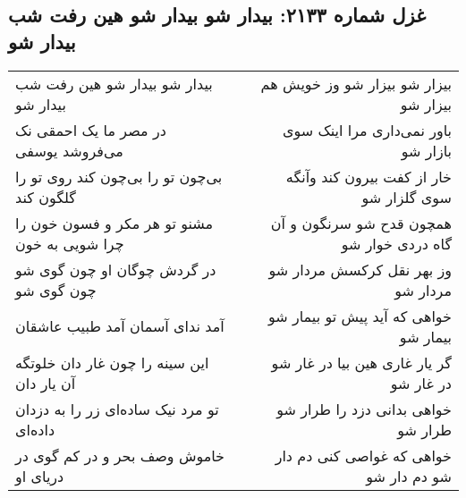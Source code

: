 \begin{center}
\section*{غزل شماره ۲۱۳۳: بیدار شو بیدار شو هین رفت شب بیدار شو}
\label{sec:2133}
\begin{longtable}{l p{0.5cm} r}
بیدار شو بیدار شو هین رفت شب بیدار شو
&&
بیزار شو بیزار شو وز خویش هم بیزار شو
\\
در مصر ما یک احمقی نک می‌فروشد یوسفی
&&
باور نمی‌داری مرا اینک سوی بازار شو
\\
بی‌چون تو را بی‌چون کند روی تو را گلگون کند
&&
خار از کفت بیرون کند وآنگه سوی گلزار شو
\\
مشنو تو هر مکر و فسون خون را چرا شویی به خون
&&
همچون قدح شو سرنگون و آن گاه دردی خوار شو
\\
در گردش چوگان او چون گوی شو چون گوی شو
&&
وز بهر نقل کرکسش مردار شو مردار شو
\\
آمد ندای آسمان آمد طبیب عاشقان
&&
خواهی که آید پیش تو بیمار شو بیمار شو
\\
این سینه را چون غار دان خلوتگه آن یار دان
&&
گر یار غاری هین بیا در غار شو در غار شو
\\
تو مرد نیک ساده‌ای زر را به دزدان داده‌ای
&&
خواهی بدانی دزد را طرار شو طرار شو
\\
خاموش وصف بحر و در کم گوی در دریای او
&&
خواهی که غواصی کنی دم دار شو دم دار شو
\\
\end{longtable}
\end{center}
